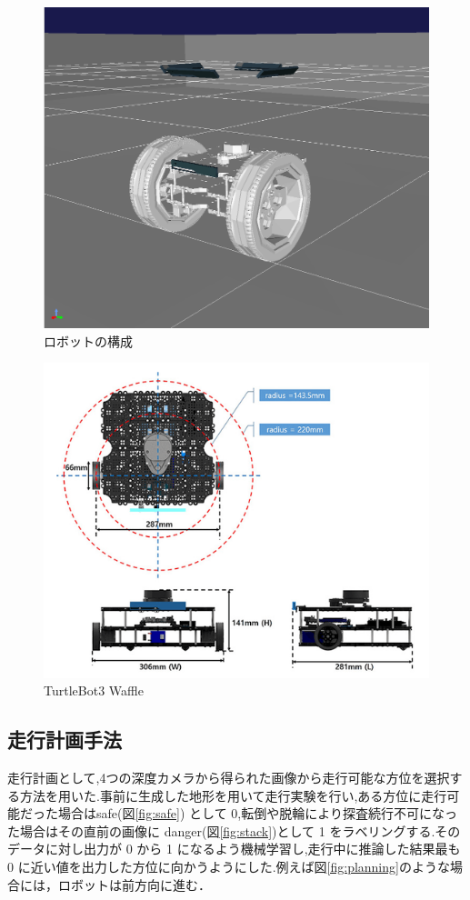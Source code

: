 \documentclass[uplatex,twocolumn, dvipdfmx]{jsarticle}  %
\begin{document}
\begin{figure}[t]
  \begin{center}
   \includegraphics[width=0.4\linewidth]{images/robot_visual.png}
   \caption{ロボットの構成}
   \label{fig:fig}
  \end{center}
 \end{figure}


\begin{figure}[t]
  \begin{center}
   \includegraphics[width=0.7\linewidth]{images/turtlebot.png}
   \caption{TurtleBot3 Waffle}
   \label{fig:turtlebot}
  \end{center}
 \end{figure}


\subsection{走行計画手法}
走行計画として,4つの深度カメラから得られた画像から走行可能な方位を選択する方法を用いた.事前に生成した地形を用いて走行実験を行い,ある方位に走行可能だった場合はsafe(図\ref{fig:safe}) として 0,転倒や脱輪により探査続行不可になった場合はその直前の画像に danger(図\ref{fig:stack})として 1 をラベリングする.そのデータに対し出力が 0 から 1 になるよう機械学習し,走行中に推論した結果最も 0 に近い値を出力した方位に向かうようにした.例えば図\ref{fig:planning}のような場合には，ロボットは前方向に進む．
\end{document}
